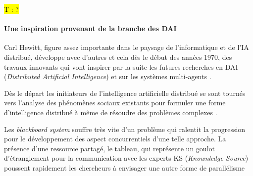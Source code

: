 



\hl{T : ?}


\paragraph{Une inspiration provenant de la branche des DAI}
\label{p:communautes_usa}

Carl Hewitt, figure assez importante dans le paysage de l'informatique et de l'IA distribué, développe avec d'autres et cela dès le début des années 1970, des travaux innovants qui vont inspirer par la suite les futures recherches en DAI (\textit{Distributed Artificial Intelligence}) et sur les systèmes multi-agents \autocite{Ferber1995}.

Dès le départ les initiateurs de l'intelligence artificielle distribué se sont tournés vers l'analyse des phénomènes sociaux existants pour formuler une forme d'intelligence distribué à même de résoudre des problèmes complexes .

Les \textit{blackboard system} souffre très vite d'un problème qui ralentit la progression pour le développement des aspect concurrentiels d'une telle approche. La présence d'une ressource partagé, le tableau, qui représente un goulot d'étranglement pour la communication avec les experts KS (\textit{Knownledge Source}) poussent rapidement les chercheurs à envisager une autre forme de parallélisme \autocite{Wooldridge2009}

